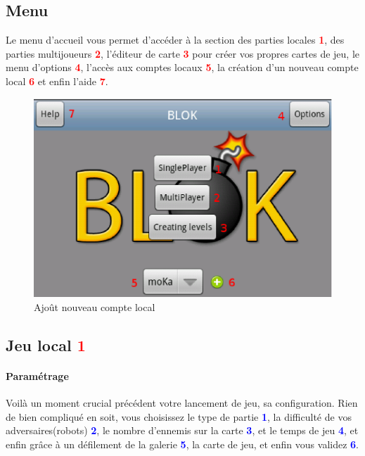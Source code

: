 \subsection{Menu}	
	Le menu d'accueil vous permet d'accéder à la section des parties locales
	\textcolor{red}{\textbf{1}}, des parties multijoueurs
	\textcolor{red}{\textbf{2}}, l'éditeur de carte \textcolor{red}{\textbf{3}}
	pour créer vos propres cartes de jeu, le menu d'options
	\textcolor{red}{\textbf{4}}, l'accès aux comptes locaux
	\textcolor{red}{\textbf{5}}, la création d'un nouveau compte local
	\textcolor{red}{\textbf{6}} et enfin l'aide \textcolor{red}{\textbf{7}}.
	\begin{figure}[h]
		\centering
			\includegraphics[scale=0.7]{Manuel/Img/3.eps}
			\caption{Ajoût nouveau compte local}
	\end{figure}
	
	
	
	\subsection{Jeu local \textcolor{red}{1}}
	\paragraph{Paramétrage\\}
	Voilà un moment crucial précédent votre lancement de jeu, sa configuration.
	Rien de bien compliqué en soit, vous choisissez le type de partie
	\textcolor{blue}{\textbf{1}}, la difficulté de vos adversaires(robots)
	\textcolor{blue}{\textbf{2}}, le nombre d'ennemis sur la carte
	\textcolor{blue}{\textbf{3}}, et le temps de jeu \textcolor{blue}{\textbf{4}},
	et enfin grâce à un défilement de la galerie \textcolor{blue}{\textbf{5}}, la
	carte de jeu, et enfin vous validez \textcolor{blue}{\textbf{6}}.
	
